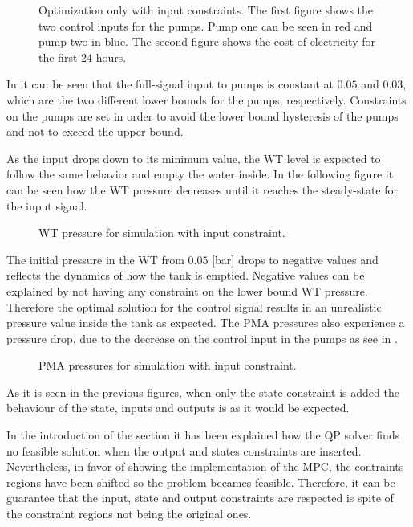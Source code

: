 \begin{figure}[H]
\centering
 
\caption{Optimization only with input constraints. The first figure shows the two control inputs for the pumps. Pump one can be seen in red and pump two in blue. The second figure shows the cost of electricity for the first 24 hours.}
\label{fig:Implementation_shit}
\end{figure}

In  it can be seen that the full-signal input to pumps is constant at $0.05$ and $0.03$, which are the two different lower bounds for the pumps, respectively. Constraints on the pumps are set in order to avoid the lower bound hysteresis of the pumps and not to exceed the upper bound. 

As the input drops down to its minimum value, the WT level is expected to follow the same behavior and empty the water inside. In the following figure it can be seen how the WT pressure decreases until it reaches the steady-state for the input signal.

\begin{figure}[H]
\centering
 
\caption{WT pressure for simulation with input constraint.}
\label{fig:WT_input}
\end{figure}

The initial pressure in the WT from $0.05$ [bar] drops to negative values and reflects the dynamics of how the tank is emptied. Negative values can be explained by not having any constraint on the lower bound WT pressure. Therefore the optimal solution for the control signal results in an unrealistic pressure value inside the tank as expected. 
The PMA pressures also experience a pressure drop, due to the decrease on the control input in the pumps as see in .

\begin{figure}[H]
\centering
 
\caption{PMA pressures for simulation with input constraint.}
\label{fig:Output_input}
\end{figure}

As it is seen in the previous figures, when only the state constraint is added the behaviour of the state, inputs and outputs is as it would be expected. 

In the introduction of the section it has been explained how the QP solver finds no feasible solution when the output and states constraints are inserted. Nevertheless, in favor of showing the implementation of the MPC, the contraints regions have been shifted so the problem becames feasible. Therefore, it can be guarantee that the input, state and output constraints are respected is spite of the constraint regions not being the original ones. 

